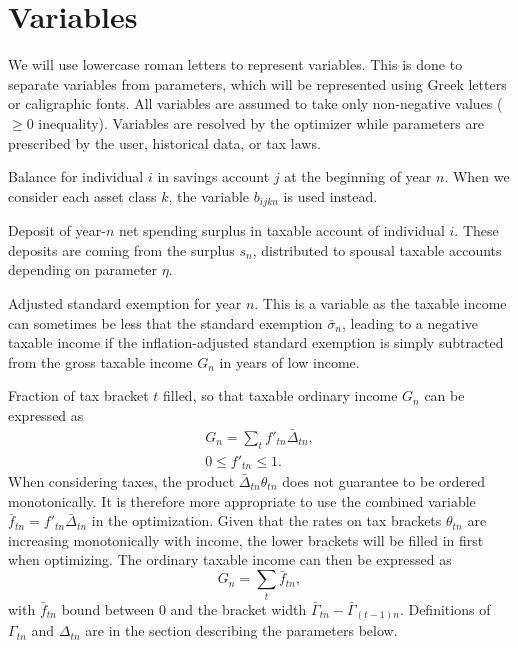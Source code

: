 \documentclass{report}[fleqn,11pt]
\begin{document}
\section{Variables}
We will use lowercase roman letters to represent variables. This is done to separate
variables from parameters, which will be represented using
Greek letters or caligraphic fonts. All variables are assumed
to take only non-negative values ($\ge 0$ inequality). Variables are resolved by the optimizer
while parameters are prescribed by the user, historical data, or tax laws.
\begin{description}[leftmargin=4em,style=multiline]
\item [$b_{ijn}$]
	Balance for individual $i$ in savings account $j$ at the beginning of year $n$.
	When we consider each asset class $k$, the variable $b_{ijkn}$ is used instead.
\item [$d_{in}$]
	Deposit of year-$n$ net spending surplus in taxable account of individual $i$.
	These deposits are coming from the surplus $s_n$, distributed to
	spousal taxable accounts depending on parameter $\eta$.
\item [$e_{n}$]
	Adjusted standard exemption for year $n$. This is a variable as the taxable income can
        sometimes be less that the standard exemption $\bar{\sigma}_n$, leading to a
	negative taxable income if the inflation-adjusted standard exemption is simply subtracted
	from the gross taxable income $G_n$ in years of low income.
\item [$f_{t n}$]
	Fraction of tax bracket $t$ filled, so that taxable ordinary income $G_n$ can be expressed as
	\begin{eqnarray}
		G_n = \sum_t f'_{t n}\bar{\Delta}_{t n},\\
		0 \leq f'_{t n} \leq 1.
	\end{eqnarray}
	When considering taxes,
	the product $\bar{\Delta}_{tn}\theta_{tn}$ does not guarantee to
	be ordered monotonically. It is therefore more appropriate to use the combined variable
	$\bar{f}_{tn} = f'_{tn}\bar{\Delta}_{tn}$ in the optimization. Given that the rates on
	tax brackets $\theta_{tn}$ are increasing monotonically with income, the lower brackets
	will be filled in first when optimizing. The ordinary taxable income can then be expressed as
	\begin{equation}
		\label{Eq:Tx1}
		G_n = \sum_t \bar{f}_{tn},
	\end{equation}
	with $\bar{f}_{tn}$ bound between 0 and the bracket width $\bar{\Gamma}_{tn} - \bar{\Gamma}_{(t-1)n}$. 
	Definitions of $\Gamma_{tn}$ and $\Delta_{tn}$ are in the section describing the parameters below. 


\end{description}
\end{document}

